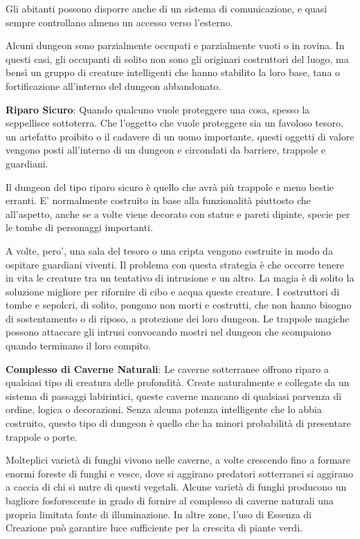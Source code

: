 \documentclass[a4paper,11pt,twoside,openany]{book}
\begin{document}
Gli abitanti possono disporre anche di un sistema di comunicazione, e quasi sempre
controllano almeno un accesso verso l'esterno.

Alcuni dungeon sono parzialmente occupati e parzialmente vuoti o in rovina. In questi casi, gli occupanti di solito non sono gli originari costruttori del luogo, ma bensì un gruppo di creature intelligenti che hanno stabilito la loro base, tana o fortificazione all'interno del dungeon abbandonato.

\textbf{Riparo Sicuro}: Quando qualcuno vuole proteggere una cosa, spesso la seppellisce sottoterra. Che l'oggetto che vuole proteggere sia un favoloso tesoro, un artefatto proibito o il cadavere di un uomo importante, questi oggetti di valore vengono posti all'interno di un dungeon e circondati da barriere, trappole e guardiani.

Il dungeon del tipo riparo sicuro è quello che avrà più trappole e meno bestie erranti. E' normalmente costruito in base alla funzionalità piuttosto che all'aspetto, anche se a volte viene decorato con statue e pareti dipinte, specie per le tombe di personaggi importanti.

A volte, pero', una sala del tesoro o una cripta vengono costruite in modo da ospitare guardiani viventi. Il problema con questa strategia è che occorre tenere in vita le creature tra un tentativo di intrusione e un altro. La magia è di solito la soluzione migliore per rifornire di cibo e acqua queste creature. I costruttori di tombe e sepolcri, di solito, pongono non morti e costrutti, che non hanno bisogno di sostentamento o di riposo, a protezione dei loro dungeon. Le trappole magiche possono attaccare gli intrusi convocando mostri nel dungeon che scompaiono quando terminano il loro compito.

\textbf{Complesso di Caverne Naturali}: Le caverne sotterranee offrono riparo a qualsiasi tipo di creatura delle profondità. Create naturalmente e collegate da un sistema di passaggi labirintici, queste caverne mancano di qualsiasi parvenza di ordine, logica o decorazioni. Senza alcuna potenza intelligente che lo abbia costruito, questo tipo di dungeon è quello che ha minori probabilità di presentare trappole o porte.

Molteplici varietà di funghi vivono nelle caverne, a volte crescendo fino a formare enormi foreste di funghi e vesce, dove si aggirano predatori sotterranei si aggirano a caccia di chi si nutre di questi vegetali. Alcune varietà di funghi producono un bagliore fosforescente in grado di fornire al complesso di caverne naturali una propria limitata fonte di illuminazione. In altre zone, l'uso di Essenza di Creazione può garantire luce sufficiente per la crescita di piante verdi.
\end{document}

